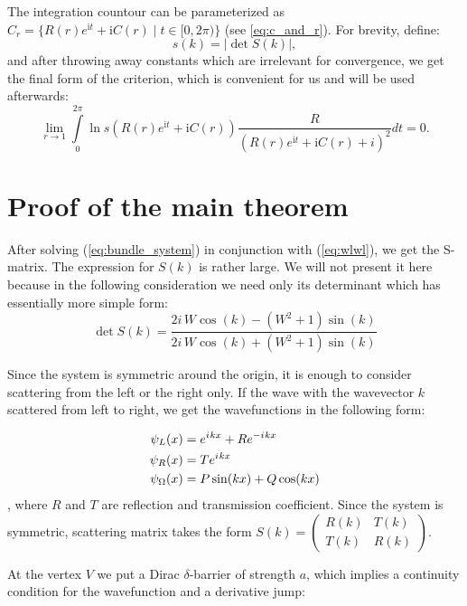 \documentclass{birkjour}
\theoremstyle{definition}
\theoremstyle{remark}
\numberwithin{equation}{section}
\newcommand{\eexp}[1]{e^{#1}}
\newcommand{\iu}{{i\mkern1mu}}
\begin{document}
The integration countour can be parameterized as $C_r = \{R(r)
e^{\mathrm{i} t} + \mathrm{i} C(r) \mid t \in [0, 2 \pi)\}$ (see
\ref{eq:c_and_r}). For brevity, define:
\[
s(k) = \left|\det S(k)\right|,
\]
and after throwing away constants which are irrelevant for
convergence, we get the final form of the criterion, which is
convenient for us and will be used afterwards:
\begin{equation}\label{eq:critp}
\lim\limits_{r \to 1} \int\limits_{0}^{2 \pi} \ln s(R(r)
e^{\mathrm{i} t} + \mathrm{i} C(r)) \frac{R}{(R(r) e^{\mathrm{i}
t} + \mathrm{i} C(r) + i)^2} dt = 0.
\end{equation}

\section{Proof of the main theorem}

After solving (\ref{eq:bundle_system}) in conjunction with
(\ref{eq:wlwl}), we get the S-matrix. The expression for $S(k)$ is
rather large. We will not present it here because in the following
consideration we need only its determinant which has essentially
more simple form:
\begin{equation}\label{det-s}
\det S(k) = \frac{2 i \, W \cos\left(k\right) -
{\left(W^{2} + 1\right)} \sin\left(k\right)}{2 i \,
W \cos\left(k\right) + {\left(W^{2} + 1\right)} \sin\left(k\right)}
\end{equation}

Since the system is symmetric around the origin, it is enough to consider scattering from the left or the right only. If the wave with the wavevector $k$ scattered from left to right, we get the wavefunctions in the following form:

\begin{align*}
\psi_L(x) &= \eexp{\iu k x} + R \eexp{-\iu k x} \\
\psi_R(x) &= T \eexp{\iu k x}\\
\psi_\Omega(x) &= P \sin(k x) + Q \cos(k x)
\end{align*}
, where $R$ and $T$ are reflection and transmission coefficient. Since the system is symmetric, scattering matrix takes the form
$S(k) = \begin{pmatrix} R(k) & T(k) \\ T(k) & R(k) \end{pmatrix}$.

At the vertex $V$ we put a Dirac $\delta$-barrier of strength $a$, which implies a continuity condition for the wavefunction and a derivative jump:
\end{document}
